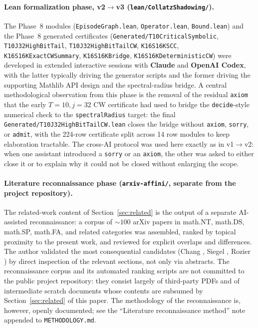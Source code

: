 \documentclass[11pt,a4paper]{article}
\theoremstyle{definition}
\begin{document}
\paragraph{Lean formalization phase, v2$\to$v3
(\texttt{lean/CollatzShadowing/}).}
The Phase~8 modules (\texttt{EpisodeGraph.lean},
\texttt{Operator.lean}, \texttt{Bound.lean}) and the Phase~8
generated certificates (\texttt{Generated/T10CriticalSymbolic},
\texttt{T10J32HighBitTail}, \texttt{T10J32HighBitTailCW},
\texttt{K16S16KSCC}, \texttt{K16S16KExactCWSummary},
\texttt{K16S16KBridge}, \texttt{K16S16KDeterministicCW}) were
developed in extended interactive sessions with
\textbf{Claude} and \textbf{OpenAI Codex}, with the latter
typically driving the generator scripts and the former driving
the supporting Mathlib API design and the spectral-radius
bridge. A central methodological observation from this phase is
the removal of the residual \texttt{axiom} that the early
$T = 10, j = 32$ CW certificate had used to bridge the
\texttt{decide}-style numerical check to the
\texttt{spectralRadius} target: the final
\texttt{Generated/T10J32HighBitTailCW.lean} closes the bridge
without \texttt{axiom}, \texttt{sorry}, or \texttt{admit}, with
the 224-row certificate split across 14 row modules to keep
elaboration tractable. The cross-AI protocol was used here
exactly as in v1$\to$v2: when one assistant introduced a
\texttt{sorry} or an \texttt{axiom}, the other was asked to
either close it or to explain why it could not be closed
without enlarging the scope.

\paragraph{Literature reconnaissance phase
(\texttt{arxiv-affini/}, separate from the project repository).}
The related-work content of Section~\ref{sec:related} is the
output of a separate AI-assisted reconnaissance: a corpus of
$\sim 100$ arXiv papers in math.NT, math.DS, math.SP, math.FA, and
related categories was assembled, ranked by topical proximity to
the present work, and reviewed for explicit overlaps and
differences. The author validated the most consequential
candidates (Chang \cite{chang2026}, Siegel \cite{siegel2023a},
Rozier \cite{rozier2025}) by direct inspection of the relevant
sections, not only via abstracts. The reconnaissance corpus and
its automated ranking scripts are not committed to the public
project repository: they consist largely of third-party PDFs and
of intermediate scratch documents whose contents are subsumed by
Section~\ref{sec:related} of this paper. The methodology of the
reconnaissance is, however, openly documented; see the
``Literature reconnaissance method'' note appended to
\texttt{METHODOLOGY.md}.
\end{document}
